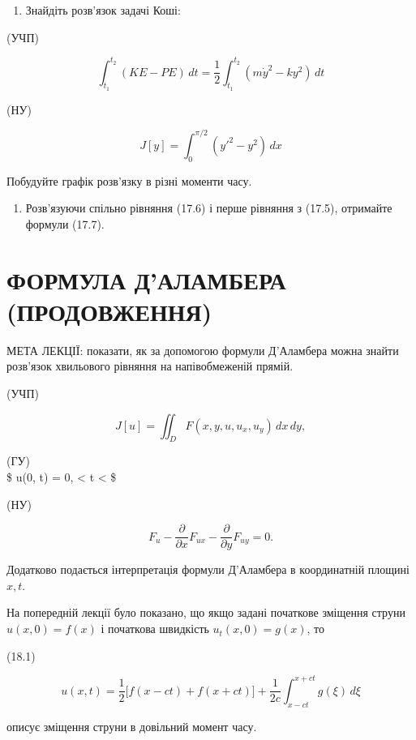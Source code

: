 \documentclass[
  ukrainian,
]{article}
\providecommand{\tightlist}{%
  \setlength{\itemsep}{0pt}\setlength{\parskip}{0pt}}
\begin{document}
\begin{enumerate}
\def\labelenumi{\arabic{enumi}.}
\setcounter{enumi}{3}
\tightlist
\item
  Знайдіть розв'язок задачі Коші:
\end{enumerate}

(УЧП)

\[
\int_{t_{1}}^{t_{2}} (KE - PE)\,dt = \frac{1}{2} \int_{t_{1}}^{t_{2}} (m\dot{y}^{2} - ky^{2})\,dt
\]

(НУ)

\[
J[y] = \int_{0}^{\pi/2} (y'^{2} - y^{2})\,dx
\]

Побудуйте графік розв'язку в різні моменти часу.

\begin{enumerate}
\def\labelenumi{\arabic{enumi}.}
\setcounter{enumi}{4}
\tightlist
\item
  Розв'язуючи спільно рівняння (17.6) і перше рівняння з (17.5),
  отримайте формули (17.7).
\end{enumerate}

\section{ФОРМУЛА Д'АЛАМБЕРА
(ПРОДОВЖЕННЯ)}\label{ux444ux43eux440ux43cux443ux43bux430-ux434ux430ux43bux430ux43cux431ux435ux440ux430-ux43fux440ux43eux434ux43eux432ux436ux435ux43dux43dux44f}

МЕТА ЛЕКЦІЇ: показати, як за допомогою формули Д'Аламбера можна знайти
розв'язок хвильового рівняння на напівобмеженій прямій.

(УЧП)

\[
J[u] = \iint_D F(x, y, u, u_x, u_y)\,dx\,dy,
\]

(ГУ)\\
\$ u(0, t) = 0, \textless{} t \textless{} \infty \$

(НУ)

\[
F_u - \frac{\partial}{\partial x}F_{ux} - \frac{\partial}{\partial y}F_{uy} = 0.
\]

Додатково подається інтерпретація формули Д'Аламбера в координатній
площині \(x, t\).

На попередній лекції було показано, що якщо задані початкове зміщення
струни \(u(x,0)=f(x)\) і початкова швидкість \(u_t(x,0)=g(x)\), то

(18.1)

\[
u(x,t)=\frac{1}{2}\big[f(x-ct)+f(x+ct)\big]+\frac{1}{2c}\int_{x-ct}^{x+ct} g(\xi)\,d\xi
\]

описує зміщення струни в довільний момент часу.
\end{document}
